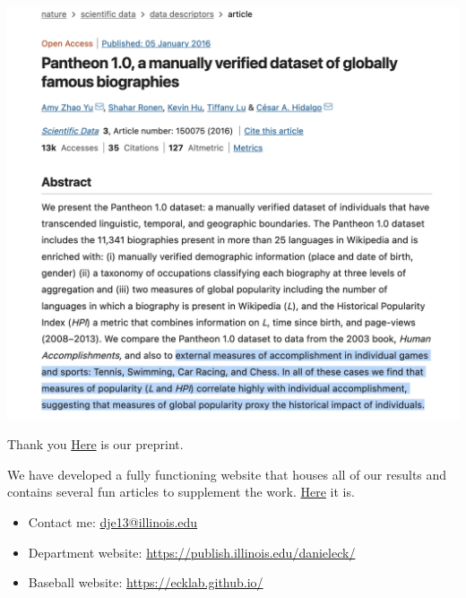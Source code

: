 \documentclass[
  ignorenonframetext,
]{beamer}
\providecommand{\tightlist}{%
  \setlength{\itemsep}{0pt}\setlength{\parskip}{0pt}}
\begin{document}
\begin{frame}{}
\protect\hypertarget{section-16}{}
\includegraphics{Pantheon.png}
\end{frame}

\begin{frame}{Thank you}
\protect\hypertarget{thank-you}{}
\href{https://arxiv.org/abs/2207.11332}{Here} is our preprint.

\vspace{12pt}

We have developed a fully functioning website that houses all of our
results and contains several fun articles to supplement the work.
\href{https://eckeraadjustment.web.illinois.edu/\#rankings}{Here} it is.

\vspace{12pt}

\begin{itemize}
\tightlist
\item
  Contact me: \url{dje13@illinois.edu}
\item
  Department website: \url{https://publish.illinois.edu/danieleck/}
\item
  Baseball website: \url{https://ecklab.github.io/}
\end{itemize}
\end{frame}
\end{document}
